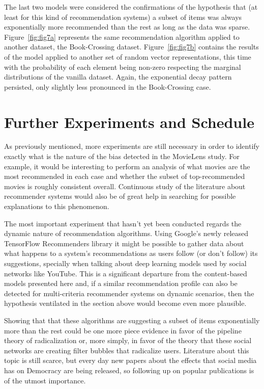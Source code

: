 The last two models were considered the confirmations of the hypothesis that
(at least for this kind of recommendation systems) a subset of items was always
exponentially more recommended than the rest as long as the data was sparse.
Figure~\ref{fig:fig7a} represents the same recommendation algorithm applied to
another dataset, the Book-Crossing dataset. Figure~\ref{fig:fig7b} contains the
results of the model applied to another set of random vector representations,
this time with the probability of each element being non-zero respecting the
marginal distributions of the vanilla dataset. Again, the exponential decay
pattern persisted, only slightly less pronounced in the Book-Crossing case.

\section{Further Experiments and Schedule}
\label{sec:schedule}

As previously mentioned, more experiments are still necessary in order to
identify exactly what is the nature of the bias detected in the MovieLens study.
For example, it would be interesting to perform an analysis of what movies are
the most recommended in each case and whether the subset of top-recommended
movies is roughly consistent overall. Continuous study of the literature about
recommender systems would also be of great help in searching for possible
explanations to this phenomenon.

The most important experiment that hasn't yet been conducted regards the dynamic
nature of recommendation algorithms. Using Google's newly released TensorFlow
Recommenders library \citep{noauthor_tensorflow_nodate} it might be possible to
gather data about what happens to a system's recommendations as users follow (or
don't follow) its suggestions, specially when talking about deep learning models
used by social networks like YouTube. This is a significant departure from the
content-based models presented here and, if a similar recommendation profile can
also be detected for multi-criteria recommender systems on dynamic scenarios,
then the hypothesis ventilated in the section above would become even more
plausible.

Showing that that these algorithms are suggesting a subset of items
exponentially more than the rest could be one more piece evidence in favor of
the pipeline theory of radicalization or, more simply, in favor of the theory
that these social networks are creating filter bubbles that radicalize users.
Literature about this topic is still scarce, but every day new papers about the
effects that social media has on Democracy are being released, so following up
on popular publications is of the utmost importance.

